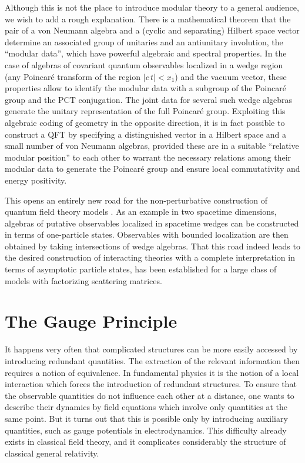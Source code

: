 \documentclass[multphys,vecphys]{svmult}
\begin{document}
Although this is not the place to introduce modular theory \cite{Bo}
to a general audience, we wish to add a rough explanation. There is
a mathematical theorem that the pair of a von Neumann algebra and a
(cyclic and separating) Hilbert space vector determine an associated
group of unitaries and an antiunitary involution, the ``modular data'', 
which have powerful algebraic and spectral properties. In the case of
algebras of covariant quantum observables localized in a wedge region
(any Poincar\'e transform of the region $\vert c\,t\vert <x_1$) and
the vacuum vector, these properties allow to identify the modular data
with a subgroup of the Poincar\'e group and the PCT conjugation. The
joint data for several such wedge algebras generate the unitary
representation of the full Poincar\'e group. Exploiting this algebraic
coding of geometry in the opposite direction, it is in fact possible to
construct a QFT by specifying a distinguished vector in a Hilbert
space and a small number of von Neumann algebras, provided these are
in a suitable ``relative modular position'' to each other to warrant
the necessary relations among their modular data to generate the
Poincar\'e group and ensure local commutativity and energy positivity. 

This opens an entirely new road for the
non-perturbative construction 
of quantum field theory models \cite{SW}. As an example in two
spacetime dimensions, algebras of putative observables localized in
spacetime wedges can be constructed in terms of one-particle
states. Observables with bounded localization are then obtained by
taking intersections of wedge algebras. That this road indeed leads to
the desired construction of interacting theories with a complete
interpretation in terms of asymptotic particle states, has been
established \cite{L} for a large class of models with factorizing
scattering matrices.          


\section{The Gauge Principle}\label{gauge}

It happens very often that complicated structures can be more easily 
accessed by introducing redundant quantities. The extraction of the
relevant information then requires a notion of equivalence. In
fundamental physics it is the notion of a local
interaction which forces the introduction of redundant structures. To
ensure that the observable quantities do not influence each other at a
distance, one wants to describe their dynamics by field equations
which involve only quantities at the same point. But it turns out that
this is possible only by introducing auxiliary quantities, such as
gauge potentials in electrodynamics. This difficulty already exists in
classical field theory, and it complicates considerably the structure
of classical general relativity.   
\end{document}
